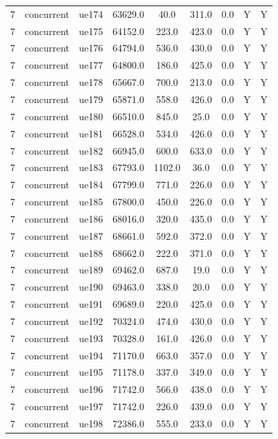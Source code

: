 \begin{table}[ht]
\begin{tabular}{|c|c|c|c|c|c|c|c|c|}
7 & concurrent & ue174 & 63629.0 & 40.0 & 311.0 & 0.0 & Y & Y \\
7 & concurrent & ue175 & 64152.0 & 223.0 & 423.0 & 0.0 & Y & Y \\
7 & concurrent & ue176 & 64794.0 & 536.0 & 430.0 & 0.0 & Y & Y \\
7 & concurrent & ue177 & 64800.0 & 186.0 & 425.0 & 0.0 & Y & Y \\
7 & concurrent & ue178 & 65667.0 & 700.0 & 213.0 & 0.0 & Y & Y \\
7 & concurrent & ue179 & 65871.0 & 558.0 & 426.0 & 0.0 & Y & Y \\
7 & concurrent & ue180 & 66510.0 & 845.0 & 25.0 & 0.0 & Y & Y \\
7 & concurrent & ue181 & 66528.0 & 534.0 & 426.0 & 0.0 & Y & Y \\
7 & concurrent & ue182 & 66945.0 & 600.0 & 633.0 & 0.0 & Y & Y \\
7 & concurrent & ue183 & 67793.0 & 1102.0 & 36.0 & 0.0 & Y & Y \\
7 & concurrent & ue184 & 67799.0 & 771.0 & 226.0 & 0.0 & Y & Y \\
7 & concurrent & ue185 & 67800.0 & 450.0 & 226.0 & 0.0 & Y & Y \\
7 & concurrent & ue186 & 68016.0 & 320.0 & 435.0 & 0.0 & Y & Y \\
7 & concurrent & ue187 & 68661.0 & 592.0 & 372.0 & 0.0 & Y & Y \\
7 & concurrent & ue188 & 68662.0 & 222.0 & 371.0 & 0.0 & Y & Y \\
7 & concurrent & ue189 & 69462.0 & 687.0 & 19.0 & 0.0 & Y & Y \\
7 & concurrent & ue190 & 69463.0 & 338.0 & 20.0 & 0.0 & Y & Y \\
7 & concurrent & ue191 & 69689.0 & 220.0 & 425.0 & 0.0 & Y & Y \\
7 & concurrent & ue192 & 70324.0 & 474.0 & 430.0 & 0.0 & Y & Y \\
7 & concurrent & ue193 & 70328.0 & 161.0 & 426.0 & 0.0 & Y & Y \\
7 & concurrent & ue194 & 71170.0 & 663.0 & 357.0 & 0.0 & Y & Y \\
7 & concurrent & ue195 & 71178.0 & 337.0 & 349.0 & 0.0 & Y & Y \\
7 & concurrent & ue196 & 71742.0 & 566.0 & 438.0 & 0.0 & Y & Y \\
7 & concurrent & ue197 & 71742.0 & 226.0 & 439.0 & 0.0 & Y & Y \\
7 & concurrent & ue198 & 72386.0 & 555.0 & 233.0 & 0.0 & Y & Y \\

\end{tabular}
\end{table}
